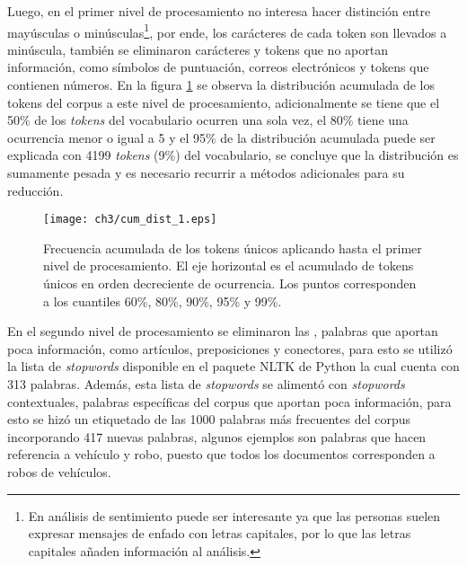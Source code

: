 \documentclass[letterpaper,12pt,oneside]{book} %
\begin{document}
Luego, en el primer nivel de procesamiento no interesa hacer distinción entre mayúsculas o minúsculas\footnote{En análisis de sentimiento puede ser interesante ya que las personas suelen expresar mensajes de enfado con letras capitales, por lo que las letras capitales añaden información al análisis.}, por ende, los carácteres de cada token son llevados a minúscula, también se eliminaron carácteres y tokens que no aportan información, como símbolos de puntuación, correos electrónicos y tokens que contienen números. En la figura \ref{img:cum_dist1} se observa la distribución acumulada de los tokens del corpus a este nivel de procesamiento, adicionalmente se tiene que el 50\% de los \textit{tokens} del vocabulario ocurren una sola vez, el 80\% tiene una ocurrencia menor o igual a 5 y el 95\% de la distribución acumulada puede ser explicada con 4199 \textit{tokens} (9\%) del vocabulario, se concluye que la distribución es sumamente pesada y es necesario recurrir a métodos adicionales para su reducción. \\

\begin{figure}
    \centering
    \texttt{[image: ch3/cum\_dist\_1.eps]}
    \caption{Frecuencia acumulada de los tokens únicos aplicando hasta el primer nivel de procesamiento. El eje horizontal es el acumulado de tokens únicos en orden decreciente de ocurrencia. Los puntos corresponden a los cuantiles 60\%, 80\%, 90\%, 95\% y 99\%.}
    \label{img:cum_dist1}
\end{figure}

En el segundo nivel de procesamiento se eliminaron las , palabras que aportan poca información, como artículos, preposiciones y conectores, para esto se utilizó la lista de \textit{stopwords} disponible en el paquete NLTK de Python \citep{bird2009natural} la cual cuenta con 313 palabras. Además, esta lista de \textit{stopwords} se alimentó con \textit{stopwords} contextuales, palabras específicas del corpus que aportan poca información, para esto se hizó un etiquetado de las 1000 palabras más frecuentes del corpus incorporando 417 nuevas palabras, algunos ejemplos son palabras que hacen referencia a vehículo y robo, puesto que todos los documentos corresponden a robos de vehículos.\\
\end{document}
